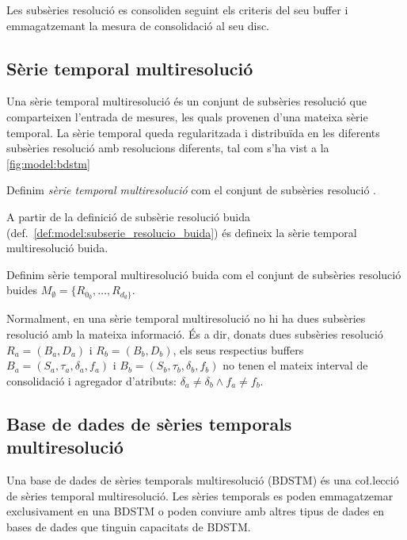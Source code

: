 Les subsèries resolució es consoliden seguint els criteris del seu
buffer i emmagatzemant la mesura de consolidació al seu disc.




\subsection{Sèrie temporal multiresolució}

Una sèrie temporal multiresolució és un conjunt de subsèries resolució que
comparteixen l'entrada de mesures, les quals provenen d'una mateixa
sèrie temporal. La sèrie temporal queda regularitzada i distribuïda en
les diferents subsèries resolució amb resolucions diferents, tal com s'ha
vist a la \autoref{fig:model:bdstm}


\begin{definition}
  Definim \emph{sèrie temporal multiresolució} com el conjunt de subsèries
  resolució .
\end{definition}

A partir de la definició de subsèrie resolució buida
(def.~\ref{def:model:subserie_resolucio_buida}) és defineix la sèrie
temporal multiresolució buida.
 
\begin{definition}\label{def:model:st_multiresolucio_buit}
  Definim sèrie temporal multiresolució buida com el conjunt de subsèries
  resolució buides
  $M_{\emptyset}=\{R_{0_{\emptyset}},\dotsc,R_{d_{\emptyset}\}}$.
\end{definition}

Normalment, en una sèrie temporal multiresolució no hi ha dues subsèries
resolució amb la mateixa informació. És a dir, donats dues subsèries
resolució $R_a = (B_a, D_a)$ i $R_b = (B_b, D_b)$, els seus respectius
buffers $B_a=(S_a,\tau_a,\delta_a,f_a)$ i
$B_b=(S_b,\tau_b,\delta_b,f_b)$ no tenen el mateix interval de
consolidació i agregador d'atributs: $\delta_a \neq \delta_b \wedge
f_a \neq f_b$.




\subsection{Base de dades de sèries temporals
  multiresolució}\label{sec:model:bdstm}

Una base de dades de sèries temporals multiresolució (BDSTM) és una
co\l.lecció de sèries temporal multiresolució.  Les sèries temporals
es poden emmagatzemar exclusivament en una BDSTM o poden conviure amb
altres tipus de dades en bases de dades que tinguin capacitats de
BDSTM.


